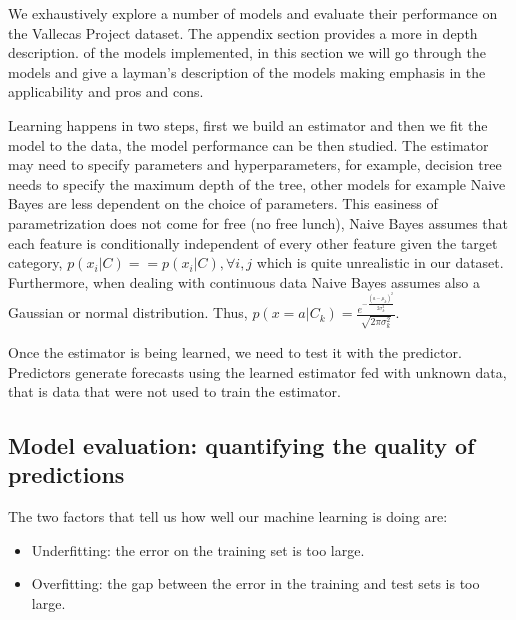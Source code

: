 \documentclass[12pt]{report}
\begin{document}
We exhaustively explore a number of models and evaluate their performance on the Vallecas Project dataset.
The appendix section provides a more in depth description.  of the models implemented, in this section we will
go through the models and give a layman's description of the models making emphasis in the applicability and pros and cons.

Learning happens in two steps, first we build an estimator and then we fit the model to the data, the model performance can be then studied. The estimator may need to specify parameters and hyperparameters, for example, decision tree needs to specify the maximum depth of the tree, other models for example Naive Bayes are less dependent on the choice of parameters. 
This easiness of parametrization does not come for free (no free lunch), Naive Bayes assumes that each feature is conditionally independent of every other feature given the target category, $p(x_i|C) == p(x_i|C), \forall i,j$ which is quite unrealistic in our dataset. Furthermore, when dealing with continuous data Naive Bayes assumes also a Gaussian or normal distribution. Thus, 
$p(x = a|C_k) = \frac{e^{-\frac{(a-\mu_k)^2}{2\sigma_k^{2}}}} {\sqrt{2\pi\sigma_k^{2}}}$. 

Once the estimator is being learned, we need to test it with the predictor. Predictors generate forecasts using the learned estimator fed with unknown  data, that is data that were not used to train the estimator.

\subsection{Model evaluation: quantifying the quality of predictions }
The two factors that tell us how well our machine learning is doing are:
\begin{itemize}
\item Underfitting: the error on the training set is too large.
\item Overfitting: the gap between the error in the training and test sets is too large. 
\end{itemize}
\end{document}
